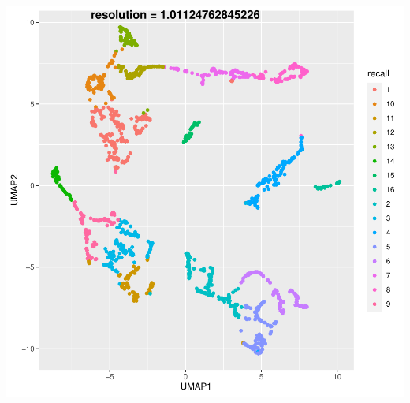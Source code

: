 \documentclass{beamer}
\begin{document}
{\begin{columns}
\begin{column}{0.50\textwidth}
			\includegraphics[width=\textwidth]{umap_recall.pdf}
		\end{column}
	\end{columns}
}
\end{document}
